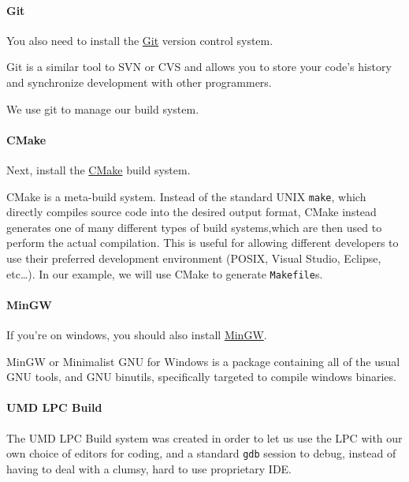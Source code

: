 \documentclass[]{article}
\begin{document}
\paragraph{Git}

You also need to install the \href{http://git-scm.com/downloads}{Git}
version control system.

Git is a similar tool to SVN or CVS and allows you to store your code's
history and synchronize development with other programmers.

We use git to manage our build system.

\paragraph{CMake}

Next, install the \href{http://www.cmake.org/}{CMake} build system.

CMake is a meta-build system. Instead of the standard UNIX
\texttt{make}, which directly compiles source code into the desired
output format, CMake instead generates one of many different types of
build systems,which are then used to perform the actual compilation.
This is useful for allowing different developers to use their preferred
development environment (POSIX, Visual Studio, Eclipse, etc\ldots{}). In
our example, we will use CMake to generate \texttt{Makefile}s.

\paragraph{MinGW}

If you're on windows, you should also install
\href{http://www.mingw.org}{MinGW}.

MinGW or Minimalist GNU for Windows is a package containing all of the
usual GNU tools, and GNU binutils, specifically targeted to compile
windows binaries.

\paragraph{UMD LPC Build}

The UMD LPC Build system was created in order to let us use the LPC with
our own choice of editors for coding, and a standard \texttt{gdb}
session to debug, instead of having to deal with a clumsy, hard to use
proprietary IDE.
\end{document}
